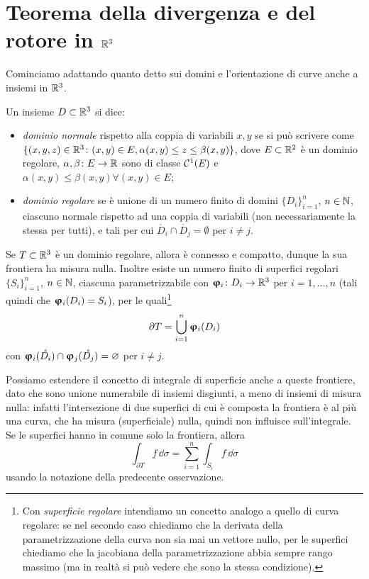 \section{Teorema della divergenza e del rotore in $\mathbb{R}^3$}
Cominciamo adattando quanto detto sui domini e l'orientazione di curve anche a insiemi in $\mathbb{R}^3$.
\begin{definizione} \label{d:dominio-R3}
	Un insieme $D\subset\mathbb{R}^3$ si dice:
	\begin{itemize}
		\item \emph{dominio normale} rispetto alla coppia di variabili $x,y$ se si può scrivere come $\{(x,y,z)\in\mathbb{R}^3\colon(x,y)\in E, \alpha(x,y)\leq z\leq\beta(x,y)\}$, dove $E\subset\mathbb{R}^2$ è un dominio regolare, $\alpha,\beta\colon E\to\mathbb{R}$ sono di classe $\mathcal{C}^{{1}}(E)$ e $\alpha(x,y)\leq\beta(x,y)\forall(x,y)\in E$;
		\item \emph{dominio regolare} se è unione di un numero finito di domini $\{D_i\}_{i=1}^n$, $n\in\mathbb{N}$, ciascuno normale rispetto ad una coppia di variabili (non necessariamente la stessa per tutti), e tali per cui $\mathring{D_i}\cap\mathring{D_j}=\emptyset$ per $i\neq j$.
	\end{itemize}
\end{definizione}
\begin{osservazione}
	Se $T\subset\mathbb{R}^3$ è un dominio regolare, allora è connesso e compatto, dunque la sua frontiera ha misura nulla.
	Inoltre esiste un numero finito di superfici regolari $\{S_i\}_{i=1}^n$, $n\in\mathbb{N}$, ciascuna parametrizzabile con $\bm{\upvarphi}_i\colon D_i\to\mathbb{R}^3$ per $i=1,\dots,n$ (tali quindi che $\bm{\upvarphi}_i(D_i)=S_i$), per le quali\footnote{Con \emph{superficie regolare} intendiamo un concetto analogo a quello di curva regolare: se nel secondo caso  chiediamo che la derivata della parametrizzazione della curva non sia mai un vettore nullo, per le superfici chiediamo che la jacobiana della parametrizzazione abbia sempre rango massimo (ma in realtà si può vedere che sono la stessa condizione).}
	\begin{equation*}
		\partial T=\bigcup_{i=1}^n\bm{\upvarphi}_i(D_i)
	\end{equation*}
	con $\bm{\upvarphi}_i(\mathring{D_i})\cap\bm{\upvarphi}_j(\mathring{D_j})=\varnothing$ per $i\neq j$.
\end{osservazione}
Possiamo estendere il concetto di integrale di superficie anche a queste frontiere, dato che sono unione numerabile di insiemi disgiunti, a meno di insiemi di misura nulla: infatti l'intersezione di due superfici di cui è composta la frontiera è al più una curva, che ha misura (superficiale) nulla, quindi non influisce sull'integrale.
Se le superfici hanno in comune solo la frontiera, allora
\begin{equation*}
	\int_{\partial T}f\,\dd\sigma=\sum_{i=1}^n\int_{S_i}f\,\dd\sigma
\end{equation*}
usando la notazione della predecente osservazione.

